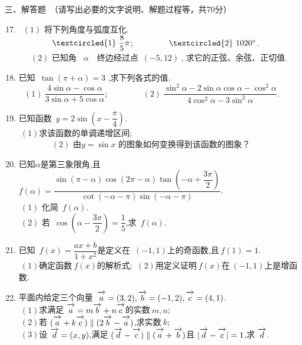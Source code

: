 \documentclass[cs(-4)size,UTF8]{ctexart}
\begin{document}
\begin{flushleft}
 \kaishu 三、解答题~（请写出必要的文字说明、解题过程等，共70分）	
\end{flushleft}
\begin{enumerate}\setcounter{enumi}{16}
\item ~$(1)$ 将下列角度与弧度互化.\\
$~~~~~~~~~~~~\textcircled{\footnotesize{1}} ~\dfrac{8}{5} \pi$;~~~~~~~ ~$\textcircled{\footnotesize{2}} ~1020^\circ$.\\
~~$~~(2)$ 已知角 ~$\alpha$~~终边经过点~$(-5,12)~$, 求它的正弦、余弦、正切值.		
\vspace{6cm}
\item  已知~$\tan(\pi+\alpha)=3$ ,求下列各式的值.\\
$~~~(1) ~\dfrac{4\sin{\alpha}-\cos{\alpha}}{3\sin{\alpha}+5\cos{\alpha}}$;~~~~~~~ ~$(2) ~\dfrac{\sin^2{\alpha}-2\sin{\alpha} \cos{\alpha}-\cos^2{\alpha}}{4\cos^2{\alpha}-3\sin^2{\alpha}}$.	
\vspace{6cm}
\item 已知函数~$y=2\sin(x-\dfrac{\pi}{4})$.\\
 $~(1)$求该函数的单调递增区间;\\~~~~~~~~$(2)$ 由$y=\sin{x}$ 的图象如何变换得到该函数的图象？			
\vspace{6cm}			
\item 已知$\alpha$是第三象限角,且~$f(\alpha)=\dfrac{\sin(\pi-\alpha) \cos(2\pi-\alpha) \tan(-\alpha+\dfrac{3\pi}{2})}{\cot(-\alpha-\pi) \sin(-\alpha-\pi)}$.\\ 
$~(1)$ 化简~$f(\alpha).$\\
$~(2)$ 若~$\cos(\alpha-\dfrac{3\pi}{2})=\dfrac{1}{5}$,求~$f(\alpha)$.
\vspace{6cm}
\item 已知~$f(x)=\dfrac{ax+b}{1+x^2}$是定义在~$(-1,1)$上的奇函数,且$~f(1)=1$.\\
$~(1)$确定函数$~f(x)$的解析式;
$~(2)$用定义证明$~f(x)$在$~(-1,1)$上是增函数.
\vspace{10cm}			
\item 平面内给定三个向量~$\overrightarrow{\mathstrut a}=(3,2),\overrightarrow{\mathstrut b}=(-1,2),\overrightarrow{\mathstrut c}=(4,1)$.\\
$~(1)$求满足$~\overrightarrow{\mathstrut a}=m\overrightarrow{\mathstrut b}+n\overrightarrow{\mathstrut c}$的实数$~m,n$;\\
$~(2)$若$~(\overrightarrow{\mathstrut a}+k\overrightarrow{\mathstrut c})\parallel(2\overrightarrow{\mathstrut b}-\overrightarrow{\mathstrut a})$,求实数$~k$;\\
$~(3)$设$~\overrightarrow{\mathstrut d}=(x,y)$,满足$~(\overrightarrow{\mathstrut d}-\overrightarrow{\mathstrut c})\parallel (\overrightarrow{\mathstrut a}+\overrightarrow{\mathstrut b})$且$~|\overrightarrow{\mathstrut d}-\overrightarrow{\mathstrut c}|=1$,求$~\overrightarrow{\mathstrut d}$.			
\end{enumerate}
\clearpage
	
\end{document}
